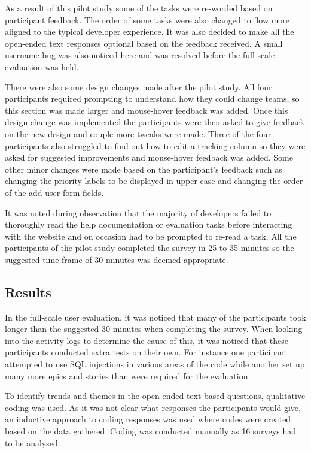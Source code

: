 \documentclass[l4proj.tex]{subfiles}
\begin{document}
As a result of this pilot study some of the tasks were re-worded based on participant feedback. The order of some tasks were also changed to flow more aligned to the typical developer experience. It was also decided to make all the open-ended text responses optional based on the feedback received. A small username bug was also noticed here and was resolved before the full-scale evaluation was held.

There were also some design changes made after the pilot study. All four participants required prompting to understand how they could change teams, so this section was made larger and mouse-hover feedback was added. Once this design change was implemented the participants were then asked to give feedback on the new design and couple more tweaks were made. Three of the four participants also struggled to find out how to edit a tracking column so they were asked for suggested improvements and mouse-hover feedback was added. Some other minor changes were made based on the participant's feedback such as changing the priority labels to be displayed in upper case and changing the order of the add user form fields.

It was noted during observation that the majority of developers failed to thoroughly read the help documentation or evaluation tasks before interacting with the website and on occasion had to be prompted to re-read a task. All the participants of the pilot study completed the survey in 25 to 35 minutes so the suggested time frame of 30 minutes was deemed appropriate.


\subsection{Results}
In the full-scale user evaluation, it was noticed that many of the participants took longer than the suggested 30 minutes when completing the survey. When looking into the activity logs to determine the cause of this, it was noticed that these participants conducted extra tests on their own. For instance one participant attempted to use SQL injections in various areas of the code while another set up many more epics and stories than were required for the evaluation. 

To identify trends and themes in the open-ended text based questions, qualitative coding was used. As it was not clear what responses the participants would give, an inductive approach to coding responses was used where codes were created based on the data gathered. Coding was conducted manually as 16 surveys had to be analysed.
\end{document}
